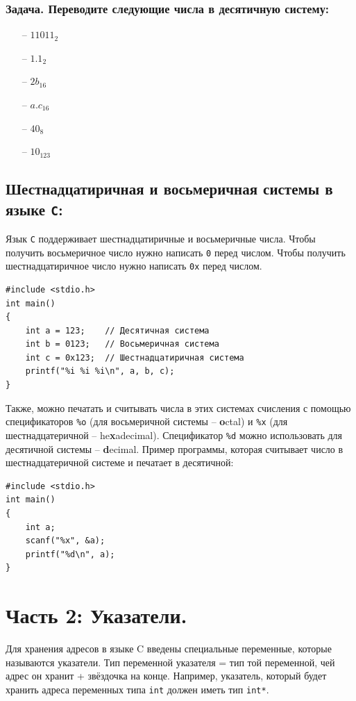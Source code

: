 \documentclass{article}
\begin{document}
\subsubsection*{Задача. Переводите следующие числа в десятичную систему:}
\begin{multicols}{3}
\begin{itemize}
\item[--] $11011_2$
\item[--] $1.1_2$
\item[--] $2b_{16}$
\item[--] $a.c_{16}$
\item[--] $40_{8}$
\item[--] $10_{123}$
\end{itemize}
\end{multicols}

\subsection*{Шестнадцатиричная и восьмеричная системы в языке \texttt{C}:}
Язык \texttt{C} поддерживает шестнадцатиричные и восьмеричные числа. Чтобы получить восьмеричное число нужно написать \texttt{0} перед числом. Чтобы получить шестнадцатиричное число нужно написать \texttt{0x} перед числом.
\begin{lstlisting}
#include <stdio.h>
int main() 
{
    int a = 123;    // Десятичная система
    int b = 0123;   // Восьмеричная система
    int c = 0x123;  // Шестнадцатиричная система
    printf("%i %i %i\n", a, b, c);
}
\end{lstlisting}
Также, можно печатать и считывать числа в этих системах счисления с помощью спецификаторов \texttt{\%o} (для восьмеричной системы -- \textbf{o}ctal) и \texttt{\%x} (для шестнадцатеричной -- he\textbf{x}adecimal). Спецификатор \texttt{\%d} можно использовать для десятичной системы -- \textbf{d}ecimal. Пример программы, которая считывает число в шестнадцатеричной системе и печатает в десятичной:
\begin{lstlisting}
#include <stdio.h>
int main() 
{
    int a;
    scanf("%x", &a);
    printf("%d\n", a);
}
\end{lstlisting}


\section*{Часть 2: Указатели.}
Для хранения адресов в языке C введены специальные переменные, которые называются указатели. Тип переменной указателя = тип той переменной, чей адрес он хранит + звёздочка на конце. Например, указатель, который будет хранить адреса переменных типа \texttt{int} должен иметь тип \texttt{int*}. \\
\end{document}
